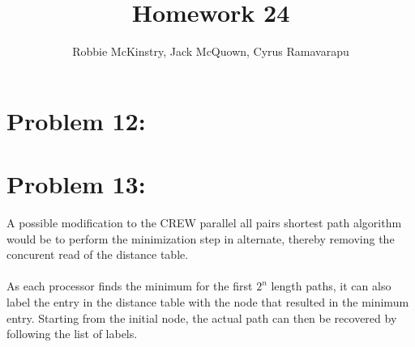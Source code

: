 \documentclass[12pt]{article}
\begin{document}
\title{Homework 24}
\author{Robbie McKinstry, Jack McQuown, Cyrus Ramavarapu}
\renewcommand{\today}{27 October 2016}
\renewcommand{\baselinestretch}{1.5}
\maketitle

\section*{Problem 12: }
\section*{Problem 13: }
A possible modification to the CREW parallel all pairs shortest
path algorithm would be to perform the minimization step in 
alternate, thereby removing the concurent read of the distance
table.\\\\
As each processor finds the minimum for the first $2^n$ length
paths, it can also label the entry in the distance table with the
node that resulted in the minimum entry.  Starting from the initial
node, the actual path can then be recovered by following the 
list of labels.
\end{document}
